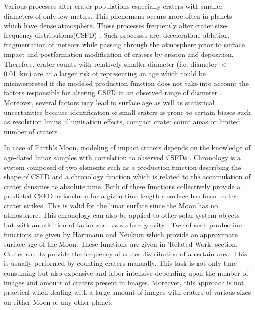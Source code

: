 \documentclass[11pt]{article}
\begin{document}
Various processes alter crater populations especially craters with smaller diameters of only few meters. This phenomena occurs more often in planets which have dense atmosphere. These processes frequently alter crater size-frequency distributions(CSFD) \cite{opik1965mariner}. Such processes are: deceleration, ablation, fragmentation of meteors while passing through the atmosphere prior to surface impact and postformation modification of craters by erosion and deposition. Therefore, crater counts with relatively smaller diameter (i.e. diameter $<$ \SI{0.01}{\kilo\metre}) are at a larger risk of representing an age which could be misinterpreted if the modeled production function does not take into account the factors responsible for altering CSFD in an observed range of diameter \cite{hartmann1981chronology}. Moreover, several factors may lead to surface age as well as statistical uncertainties because identification of small craters is prone to certain biases such as resolution limits, illumination effects, compact crater count areas or limited number of craters \cite{soderblom1970distribution}.

In case of Earth's Moon, modeling of impact craters depends on the knowledge of age-dated lunar samples with correlation to observed CSFDs \cite{williams2018dating}. Chronology is a system composed of two elements such as a production function describing the shape of CSFD and a chronology function which is related to the accumulation of crater densities to absolute time. Both of these functions collectively provide a predicted CSFD or isochron for a given time length a surface has been under crater strikes. This is valid for the lunar surface since the Moon has no atmosphere. This chronology can also be applied to other solar system objects but with an addition of factor such as surface gravity \cite{ivanov2002comparison}. Two of such production functions are given by Hartmann and Neukum which provide an approximate surface age of the Moon. These functions are given in 'Related Work' section. Crater counts provide the frequency of crater distribution of a certain area. This is usually performed by counting craters manually. This task is not only time consuming but also expensive and labor intensive depending upon the number of images and amount of craters present in images. Moreover, this approach is not practical when dealing with a large amount of images with craters of various sizes on either Moon or any other planet.
\end{document}
